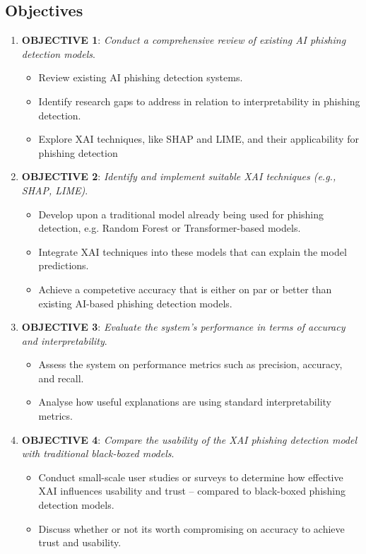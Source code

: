 
\subsection*{Objectives}

\begin{enumerate}
  \item \textbf{OBJECTIVE 1}: \textit{Conduct a comprehensive review of existing AI phishing detection models}.\label{objective-1}
  \begin{itemize}
    \item Review existing AI phishing detection systems.
    \item Identify research gaps to address in relation to interpretability in phishing detection.
    \item Explore XAI techniques, like SHAP and LIME, and their applicability for phishing detection
    \end{itemize}
  \item \textbf{OBJECTIVE 2}: \textit{Identify and implement suitable XAI techniques (e.g., SHAP, LIME)}.\label{objective-2}
  \begin{itemize}
    \item Develop upon a traditional model already being used for phishing detection, e.g. Random Forest or Transformer-based models.
    \item Integrate XAI techniques into these models that can explain the model predictions.
    \item Achieve a competetive accuracy that is either on par or better than existing AI-based phishing detection models.
  \end{itemize}
  \item \textbf{OBJECTIVE 3}: \textit{Evaluate the system's performance in terms of accuracy and interpretability}.\label{objective-3}
  \begin{itemize}
    \item Assess the system on performance metrics such as precision, accuracy, and recall.
    \item Analyse how useful explanations are using standard interpretability metrics.
  \end{itemize}
  \item \textbf{OBJECTIVE 4}: \textit{Compare the usability of the XAI phishing detection model with traditional black-boxed models}.\label{objective-4}
  \begin{itemize}
    \item Conduct small-scale user studies or surveys to determine how effective XAI influences usability and trust -- compared to black-boxed phishing detection models.
    \item Discuss whether or not its worth compromising on accuracy to achieve trust and usability.
  \end{itemize}
\end{enumerate}
